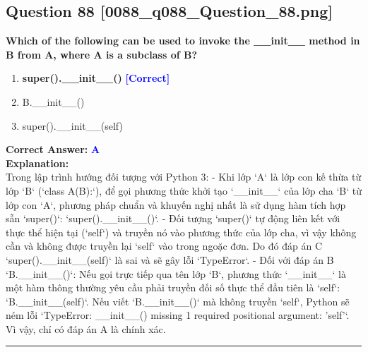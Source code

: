 \documentclass[11pt,a4paper]{article}
\begin{document}
\begin{minipage}{\textwidth}
\subsection*{Question 88 \quad \footnotesize{[0088_q088_Question_88.png]}}
\noindent \textbf{Which of the following can be used to invoke the __init__ method in B from A, where A is a subclass of B?}

\begin{enumerate}[label=\Alph*.]
    \item \textbf{super().__init__()} \hfill \textcolor{blue}{\textbf{[Correct]}}
    \item B.__init__()
    \item super().__init__(self)
\end{enumerate}

\noindent \textbf{Correct Answer:} \textcolor{blue}{\textbf{A}} \\[4pt]
\noindent \textbf{Explanation:}\\
Trong lập trình hướng đối tượng với Python 3:\newline
- Khi lớp `A` là lớp con kế thừa từ lớp `B` (`class A(B):`), để gọi phương thức khởi tạo `__init__` của lớp cha `B` từ lớp con `A`, phương pháp chuẩn và khuyến nghị nhất là sử dụng hàm tích hợp sẵn `super()`: `super().__init__()`.\newline
- Đối tượng `super()` tự động liên kết với thực thể hiện tại (`self`) và truyền nó vào phương thức của lớp cha, vì vậy không cần và không được truyền lại `self` vào trong ngoặc đơn. Do đó đáp án C `super().__init__(self)` là sai và sẽ gây lỗi `TypeError`.\newline
- Đối với đáp án B `B.__init__()`: Nếu gọi trực tiếp qua tên lớp `B`, phương thức `__init__` là một hàm thông thường yêu cầu phải truyền đối số thực thể đầu tiên là `self`: `B.__init__(self)`. Nếu viết `B.__init__()` mà không truyền `self`, Python sẽ ném lỗi `TypeError: __init__() missing 1 required positional argument: 'self'`.\newline
Vì vậy, chỉ có đáp án A là chính xác.
\end{minipage}
\vspace{0.8cm}
\hrule
\vspace{0.5cm}
\end{document}
